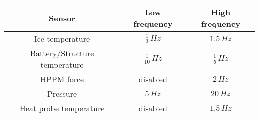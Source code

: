 \documentclass[12pt, a4paper]{scrreprt}
\begin{document}
\begin{tabular}{|c|c|c|}
	\hline 
	Sensor & Low frequency & High frequency \\ 
	\hline 
	Ice temperature & $\frac{1}{3}\,Hz$ & $1.5\,Hz$ \\ 
	\hline 
	Battery/Structure temperature & $\frac{1}{10}\,Hz$ & $\frac{1}{5}\,Hz$ \\ 
	\hline 
	HPPM force & disabled & $2\,Hz$ \\ 
	\hline 
	Pressure & $5\,Hz$ & $20\,Hz$ \\ 
	\hline 
	Heat probe temperature & disabled & $1.5\,Hz$ \\ 
	\hline 
\end{tabular}
\end{document}
